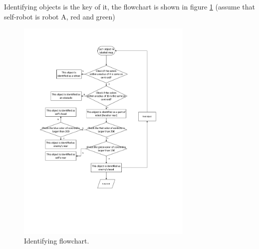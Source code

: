 Identifying objects is the key of it, the flowchart is shown in figure \ref{Id_flow} (assume that self-robot is robot A, red and green)

\begin{figure}[thb]
    \centering
    \includegraphics[width=0.75\textwidth]{images/Id_flow.pdf}
    \caption[Identifying flowchart]{Identifying flowchart.}\label{Id_flow}
\end{figure}



